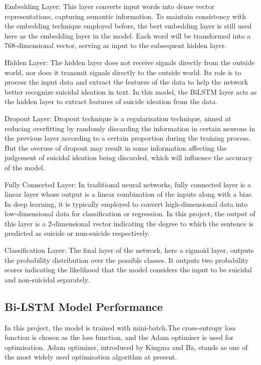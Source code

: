 \documentclass[ %
                    author={Bocheng Wang},
                supervisor={Dr. Qiang Liu},
                    degree={MSc},
                     title={A Research on Identification of Suicide Ideation in Texts with Multiple Models},
                      type={},
                      year={2024}]{dissertation}
\begin{document}
Embedding Layer: This layer converts input words into dense vector representations, capturing semantic information. To maintain consistency with the embedding technique employed before, the bert embedding layer is still used here as the embedding layer in the model. Each word will be transformed into a 768-dimensional vector, serving as input to the subsequent hidden layer.

Hidden Layer: The hidden layer does not receive signals directly from the outside world, nor does it transmit signals directly to the outside world. Its role is to process the input data and extract the features of the data to help the network better recognize suicidal ideation in text. In this model, the BiLSTM layer acts as the hidden layer to extract features of suicide ideation from the data.

Dropout Layer: Dropout technique\cite{srivastava2014dropout} is a regularisation technique, aimed at reducing overfitting by randomly discarding the information in certain neurons in the previous layer according to a certain proportion during the training process. But the overuse of dropout may result in some information affecting the judgement of suicidal ideation being discarded, which will influence the accuracy of the model.

Fully Connected Layer: In traditional neural networks, fully connected layer is a linear layer whose output is a linear combination of the inputs along with a bias. In deep learning, it is typically employed to convert high-dimensional data into low-dimensional data for classification or regression. In this project, the output of this layer is a 2-dimensional vector indicating the degree to which the sentence is predicted as suicide or nun-suicide respectively.

Classification Layer: The final layer of the network, here a sigmoid layer, outputs the probability distribution over the possible classes. It outputs two probability scores indicating the likelihood that the model considers the input to be suicidal and non-suicidal separately.

\subsection{Bi-LSTM Model Performance}
\noindent
In this project, the model is trained with mini-batch.The cross-entropy loss function is chosen as the loss function, and the Adam optimiser is used for optimisation. Adam optimizer, introduced by Kingma and Ba\cite{kingma2014adam}, stands as one of the most widely used optimisation algorithm at present.
\end{document}
